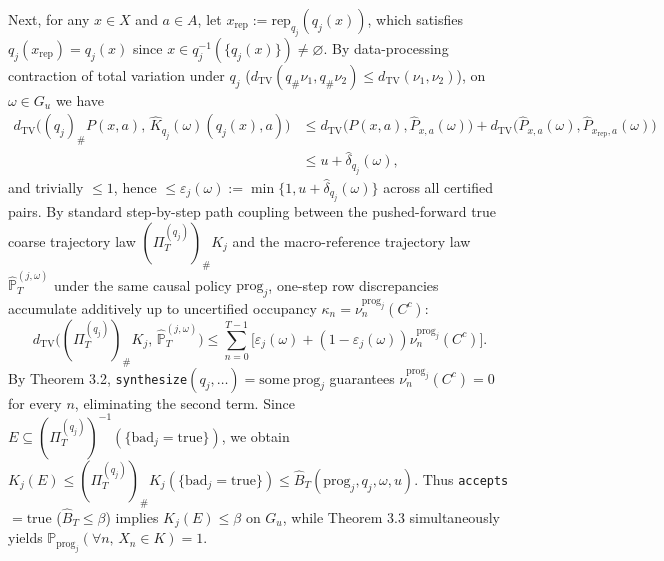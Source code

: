 \documentclass[11pt,a4paper]{article}
\begin{document}
Next, for any \(x \in X\) and \(a \in A\), let
\(x_{\mathrm{rep}} := \mathrm{rep}_{q_j}(q_j(x))\), which satisfies
\(q_j(x_{\mathrm{rep}}) = q_j(x)\) since
\(x \in q_j^{-1}(\{q_j(x)\}) \neq \varnothing\). By data-processing
contraction of total variation under \(q_j\)
(\(d_{\mathrm{TV}}(q_\# \nu_1, q_\# \nu_2) \le d_{\mathrm{TV}}(\nu_1, \nu_2)\)),
on \(\omega \in G_u\) we have \[\begin{aligned}
d_{\mathrm{TV}}\bigl((q_j)_\# P(x,a),\, \widehat{K}_{q_j}(\omega)(q_j(x), a)\bigr)
&\le d_{\mathrm{TV}}\bigl(P(x,a), \widehat{P}_{x,a}(\omega)\bigr) + d_{\mathrm{TV}}\bigl(\widehat{P}_{x,a}(\omega), \widehat{P}_{x_{\mathrm{rep}}, a}(\omega)\bigr) \\
&\le u + \widehat{\delta}_{q_j}(\omega),
\end{aligned}\] and trivially \(\le 1\), hence
\(\le \varepsilon_j(\omega) := \min\{1, u + \widehat{\delta}_{q_j}(\omega)\}\)
across all certified pairs. By standard step-by-step path coupling
between the pushed-forward true coarse trajectory law
\((\Pi_T^{(q_j)})_\# K_j\) and the macro-reference trajectory law
\(\widehat{\mathbb{P}}_T^{(j,\omega)}\) under the same causal policy
\(\mathrm{prog}_j\), one-step row discrepancies accumulate additively up
to uncertified occupancy \(\kappa_n = \nu_n^{\mathrm{prog}_j}(C^c)\):
\[d_{\mathrm{TV}}\bigl((\Pi_T^{(q_j)})_\# K_j,\, \widehat{\mathbb{P}}_T^{(j,\omega)}\bigr) \le \sum_{n=0}^{T-1} \bigl[\varepsilon_j(\omega) + (1 - \varepsilon_j(\omega))\nu_n^{\mathrm{prog}_j}(C^c)\bigr].\]
By Theorem 3.2,
\texttt{synthesize}\((q_j, \dots) = \mathrm{some\ prog}_j\) guarantees
\(\nu_n^{\mathrm{prog}_j}(C^c) = 0\) for every \(n\), eliminating the
second term. Since
\(E \subseteq (\Pi_T^{(q_j)})^{-1}(\{\mathrm{bad}_j = \mathrm{true}\})\),
we obtain
\(K_j(E) \le (\Pi_T^{(q_j)})_\# K_j(\{\mathrm{bad}_j = \mathrm{true}\}) \le \widehat{B}_T(\mathrm{prog}_j, q_j, \omega, u)\).
Thus \texttt{accepts} \(= \mathrm{true}\) (\(\widehat{B}_T \le \beta\))
implies \(K_j(E) \le \beta\) on \(G_u\), while Theorem 3.3
simultaneously yields
\(\mathbb{P}_{\mathrm{prog}_j}(\forall n,\, X_n \in K) = 1\).
\end{document}
